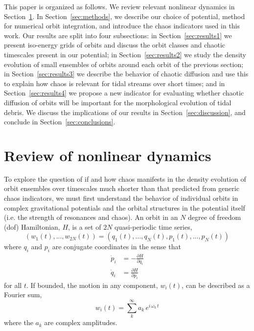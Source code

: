 \documentclass[letterpaper,12pt,preprint]{aastex}
\begin{document}
This paper is organized as follows. We review relevant nonlinear dynamics in Section~\ref{sec:nldreview}. In Section~\ref{sec:methods}, we describe our choice of potential, method for numerical orbit integration, and introduce the chaos indicators used in this work. Our results are split into four subsections: in Section~\ref{sec:results1} we present iso-energy grids of orbits and discuss the orbit classes and chaotic timescales present in our potential; in Section~\ref{sec:results2} we study the density evolution of small ensembles of orbits around each orbit of the previous section; in Section~\ref{sec:results3} we describe the behavior of chaotic diffusion and use this to explain how chaos is relevant for tidal streams over short times; and in Section~\ref{sec:results4} we propose a new indicator for evaluating whether chaotic diffusion of orbits will be important for the morphological evolution of tidal debris. We discuss the implications of our results in Section~\ref{sec:discussion}, and conclude in Section~\ref{sec:conclusions}.

\section{Review of nonlinear dynamics}\label{sec:nldreview}

To explore the question of if and how chaos manifests in the density evolution of orbit ensembles over timescales much shorter than that predicted from generic chaos indicators, we must first understand the behavior of individual orbits in complex gravitational potentials and the orbital structures in the potential itself (i.e. the strength of resonances and chaos). An orbit in an $N$ degree of freedom (dof) Hamiltonian, $H$, is a set of $2N$ quasi-periodic time series, 
\begin{equation}
(w_1(t),...,w_{2N}(t)) = (q_1(t),...,q_{N}(t),p_1(t),...,p_{N}(t)) \label{eq:coords}
\end{equation}
where $q_i$ and $p_i$ are conjugate coordinates in the sense that
\begin{align}
	\dot{p}_i &= -\frac{\partial H}{\partial q_i}\\
	\dot{q}_i &= \frac{\partial H}{\partial p_i}
\end{align}
for all $t$. If bounded, the motion in any component, $w_i(t)$, can be described as a Fourier sum,
\begin{equation}
	w_i(t) = \sum_k^\infty a_k \, e^{i\,\omega_k\,t} \label{eq:fourier}
\end{equation}
where the $a_k$ are complex amplitudes.
\end{document}
